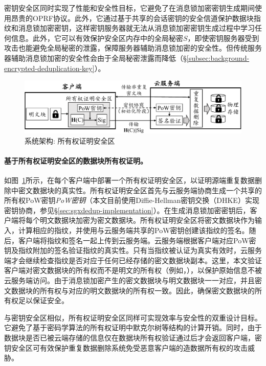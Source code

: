 密钥安全区同时实现了性能和安全性目标，它避免了在消息锁加密密钥生成期间使用昂贵的OPRF协议\cite{bellare2013DupLESS}。此外，它通过基于共享的会话密钥的安全信道保护数据块指纹和消息锁加密密钥，这样密钥服务器就无法从消息锁加密密钥生成过程中学习任何信息。此外，它可以有效保护安全区内存中的全局秘密$S$，即使密钥服务器受到攻击也能避免全局秘密的泄露，保障服务器辅助消息锁加密的安全性。但传统服务器辅助消息锁加密的安全性会由于全局秘密泄露而降低（\S\ref{subsec:background-encrypted-deduplication-key}）。

\begin{figure}[!htb]
  \centering
  \includegraphics[width=\textwidth]{pic/sgxdedup/pow.pdf}
  \caption{\sysnameS 系统架构: 所有权证明安全区}
  \label{fig:sgxdedup-overview-pow}
\end{figure}

\paragraph*{基于所有权证明安全区的数据块所有权证明。}如图~\ref{fig:sgxdedup-overview-pow}所示，\sysnameS 在每个客户端中部署一个所有权证明安全区，以证明源端重复数据删除中密文数据块的真实性。所有权证明安全区首先与云服务端协商生成一个共享的所有权PoW密钥\textit{PoW密钥}（本文目前使用Diffie-Hellman密钥交换（DHKE）实现密钥协商，参见\S\ref{sec:sgxdedup-implementation}）。在生成消息锁加密密钥后，客户端将每个明文数据块加密为密文数据块。所有权证明安全区将密文数据块作为输入，计算相应的指纹，并使用与云服务端共享的PoW密钥创建该指纹的签名。随后，客户端将指纹和签名一起上传到云服务端。云服务端根据客户端对应PoW密钥及指纹附加的签名验证指纹的真实性。只有当指纹被认证为真实有效时，云服务端才会继续检查指纹是否对应于任何已经存储的密文数据块副本。这里，本文验证客户端对密文数据块的所有权而不是明文的所有权（例如，\cite{halevi11}），以保护原始信息不被云服务端访问。由于消息锁加密产生的密文数据块与明文数据块一一对应，并且密文数据块的所有权与对应的明文数据块的所有权一致。因此，确保密文数据块的所有权足以保证安全。

与密钥安全区相似，所有权证明安全区同样可实现效率与安全性的双重设计目标。它避免了基于密码学算法的所有权证明中默克尔树等结构的计算开销。同时，由于数据块是否已被云端存储的信息仅在数据块所有权验证通过后才会返回客户端，密钥安全区可有效保护重复数据删除系统免受恶意客户端的造数据所有权的攻击威胁。

